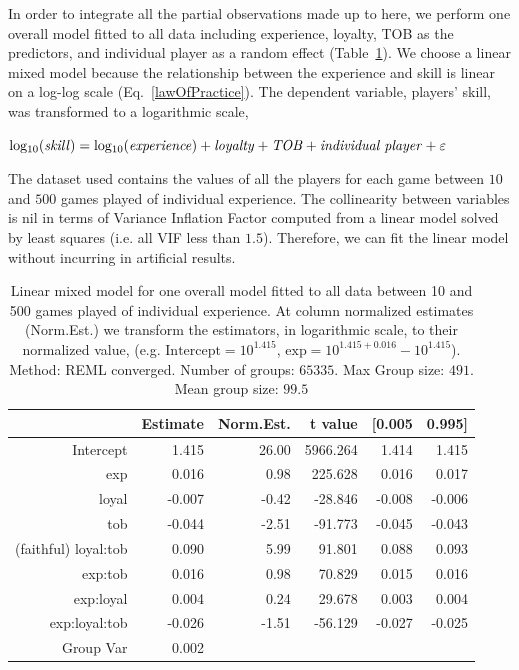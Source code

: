 \documentclass[a4paper,10pt]{book}
\theoremstyle{definition}
\begin{document}
In order to integrate all the partial observations made up to here, we perform one overall model fitted to all data including experience, loyalty, TOB as the predictors, and individual player as a random effect (Table~\ref{lmm}).
We choose a linear mixed model because the relationship between the experience and skill is linear on a log-log scale (Eq.~\ref{lawOfPractice}).
The dependent variable, players' skill, was transformed to a logarithmic scale,
  
\begin{center}    
$\text{log$_{10}$(\emph{skill})} = \text{log$_{10}$(\emph{experience})} + \text{\emph{loyalty}} + \text{\emph{TOB}} + \text{\emph{individual player}} + \varepsilon$
\end{center}

The dataset used contains the values of all the players for each game between $10$ and $500$ games played of individual experience.
The collinearity between variables is nil in terms of Variance Inflation Factor computed from a linear model solved by least squares (i.e. all VIF less than $1.5$).
Therefore, we can fit the linear model without incurring in artificial results.

\begin{table}[ht!]
\centering
\begin{tabular}{rrrrrr}
  
 & Estimate & Norm.Est. & t value  & [0.005 & 0.995] \\ 
  \hline
Intercept               &  1.415  &  26.00   & 5966.264  &  1.414 &  1.415 \\
exp           		&  0.016  &   0.98   &  225.628  &  0.016 &  0.017 \\
loyal         		& -0.007  &  -0.42   &  -28.846  & -0.008 & -0.006 \\
tob           		& -0.044  &  -2.51   &  -91.773  & -0.045 & -0.043 \\
(faithful) loyal:tob    &  0.090  &   5.99   &   91.801  &  0.088 &  0.093 \\
exp:tob       		&  0.016  &   0.98   &   70.829  &  0.015 &  0.016 \\
exp:loyal     		&  0.004  &   0.24   &   29.678  &  0.003 &  0.004 \\
exp:loyal:tob 		& -0.026  &  -1.51   &  -56.129  & -0.027 & -0.025 \\
Group Var     		&  0.002  &          &           &        &       \\   
   \hline
\end{tabular}
\caption{Linear mixed model for one overall model fitted to all data between 10 and 500 games played of individual experience. At column normalized estimates (Norm.Est.) we transform the estimators, in logarithmic scale, to their normalized value, (e.g. $\text{Intercept} = 10^{1.415}$, $\text{exp} = 10^{1.415+0.016} - 10^{1.415}$). Method: REML converged. Number of groups: $65335$. Max Group size: $491$. Mean group size: $99.5$}
\label{lmm}
\end{table}
\end{document}
